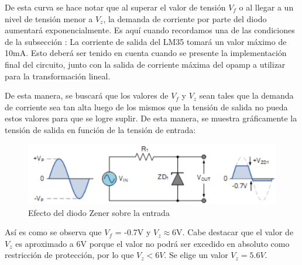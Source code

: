 \documentclass[../../main.tex]{subfiles}
\begin{document}
De esta curva se hace notar que al superar el valor de tensión $V_f$ o al llegar a un nivel de tensión menor a $V_z$, la demanda de corriente por parte del diodo aumentará exponencialmente. Es aquí cuando recordamos una de las condiciones de la subsección : La corriente de salida del LM35 tomará un valor máximo de 10mA. Esto deberá ser tenido en cuenta cuando se presente la implementación final del circuito, junto con la salida de corriente máxima del opamp a utilizar para la transformación lineal.\par
De esta manera, se buscará que los valores de $V_f$ y $V_z$ sean tales que la demanda de corriente sea tan alta luego de los mismos que la tensión de salida no pueda estos valores para que se logre suplir. De esta manera, se muestra gráficamente la tensión de salida en función de la tensión de entrada:

\begin{figure}[H]	%
	\centering
	\includegraphics[scale=0.5]{imagenes/zener_diode_efecto.png}
	\caption{Efecto del diodo Zener sobre la entrada}
	\label{fig:ej6_zener_diode_efecto}
\end{figure}

Así es como se observa que $V_f$ = -0.7V y $V_z$$\approx$6V. Cabe destacar que el valor de $V_z$ es aproximado a 6V porque el valor no podrá ser excedido en absoluto como restricción de protección, por lo que $V_z<6V$. Se elige un valor $V_z= 5.6V$.
\end{document}
